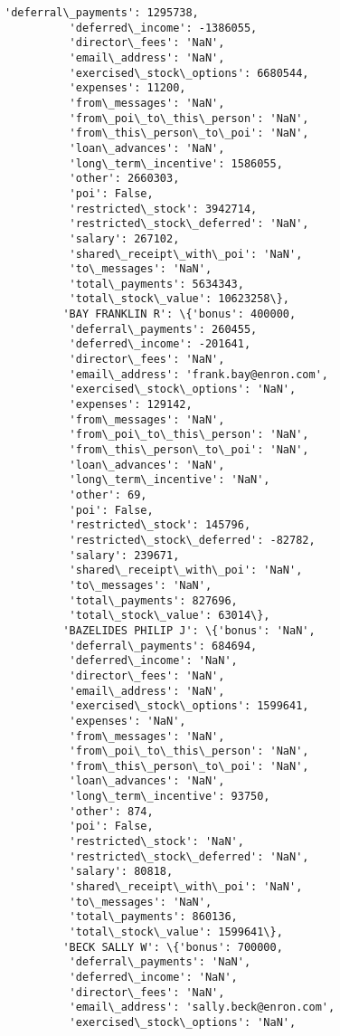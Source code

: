 \documentclass[11pt]{article}
\begin{document}
\begin{Verbatim}[commandchars=\\\{\}]
          'deferral\_payments': 1295738,
          'deferred\_income': -1386055,
          'director\_fees': 'NaN',
          'email\_address': 'NaN',
          'exercised\_stock\_options': 6680544,
          'expenses': 11200,
          'from\_messages': 'NaN',
          'from\_poi\_to\_this\_person': 'NaN',
          'from\_this\_person\_to\_poi': 'NaN',
          'loan\_advances': 'NaN',
          'long\_term\_incentive': 1586055,
          'other': 2660303,
          'poi': False,
          'restricted\_stock': 3942714,
          'restricted\_stock\_deferred': 'NaN',
          'salary': 267102,
          'shared\_receipt\_with\_poi': 'NaN',
          'to\_messages': 'NaN',
          'total\_payments': 5634343,
          'total\_stock\_value': 10623258\},
         'BAY FRANKLIN R': \{'bonus': 400000,
          'deferral\_payments': 260455,
          'deferred\_income': -201641,
          'director\_fees': 'NaN',
          'email\_address': 'frank.bay@enron.com',
          'exercised\_stock\_options': 'NaN',
          'expenses': 129142,
          'from\_messages': 'NaN',
          'from\_poi\_to\_this\_person': 'NaN',
          'from\_this\_person\_to\_poi': 'NaN',
          'loan\_advances': 'NaN',
          'long\_term\_incentive': 'NaN',
          'other': 69,
          'poi': False,
          'restricted\_stock': 145796,
          'restricted\_stock\_deferred': -82782,
          'salary': 239671,
          'shared\_receipt\_with\_poi': 'NaN',
          'to\_messages': 'NaN',
          'total\_payments': 827696,
          'total\_stock\_value': 63014\},
         'BAZELIDES PHILIP J': \{'bonus': 'NaN',
          'deferral\_payments': 684694,
          'deferred\_income': 'NaN',
          'director\_fees': 'NaN',
          'email\_address': 'NaN',
          'exercised\_stock\_options': 1599641,
          'expenses': 'NaN',
          'from\_messages': 'NaN',
          'from\_poi\_to\_this\_person': 'NaN',
          'from\_this\_person\_to\_poi': 'NaN',
          'loan\_advances': 'NaN',
          'long\_term\_incentive': 93750,
          'other': 874,
          'poi': False,
          'restricted\_stock': 'NaN',
          'restricted\_stock\_deferred': 'NaN',
          'salary': 80818,
          'shared\_receipt\_with\_poi': 'NaN',
          'to\_messages': 'NaN',
          'total\_payments': 860136,
          'total\_stock\_value': 1599641\},
         'BECK SALLY W': \{'bonus': 700000,
          'deferral\_payments': 'NaN',
          'deferred\_income': 'NaN',
          'director\_fees': 'NaN',
          'email\_address': 'sally.beck@enron.com',
          'exercised\_stock\_options': 'NaN',

\end{Verbatim}
\end{document}
